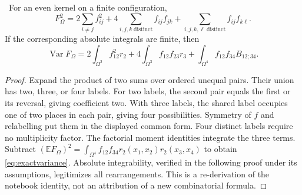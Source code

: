 \begin{lemma}\ours\ 
For an even kernel on a finite configuration,
\[
 F_\Omega^2=2\sum_{i\ne j}f_{ij}^2
 +4\sum_{i,j,k\;\mathrm{distinct}}f_{ij}f_{jk}
 +\sum_{i,j,k,\ell\;\mathrm{distinct}}f_{ij}f_{k\ell}.
\]
If the corresponding absolute integrals are finite, then
\begin{equation}
 \operatorname{Var}F_\Omega
 =2\int_{\Omega^2}f_{12}^2r_2
 +4\int_{\Omega^3}f_{12}f_{23}r_3
 +\int_{\Omega^4}f_{12}f_{34}B_{12;34}.
 \label{eq:exactvariance}
\end{equation}
\end{lemma}
\begin{proof}
Expand the product of two sums over ordered unequal pairs. Their union has two, three, or four labels. For two labels, the second pair equals the first or its reversal, giving coefficient two. With three labels, the shared label occupies one of two places in each pair, giving four possibilities. Symmetry of \(f\) and relabelling put them in the displayed common form. Four distinct labels require no multiplicity factor. The factorial moment identities integrate the three terms. Subtract
\((\mathbb EF_\Omega)^2=\int_{\Omega^4}f_{12}f_{34}r_2(x_1,x_2)r_2(x_3,x_4)\)
to obtain \eqref{eq:exactvariance}. Absolute integrability, verified in the following proof under its assumptions, legitimizes all rearrangements. This is a re-derivation of the notebook identity, not an attribution of a new combinatorial formula.
\end{proof}

